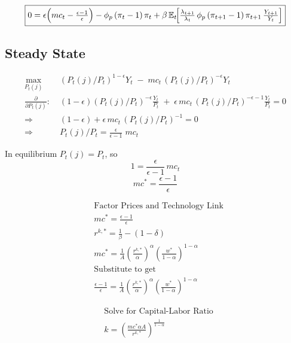 \documentclass[11pt,preprint]{elsarticle}
\numberwithin{equation}{section}
\numberwithin{figure}{section}
\numberwithin{table}{section}
\begin{document}
\begin{equation}\label{rotemberg_FOC}
\boxed{
  0 = \epsilon\Bigl(mc_t - \tfrac{\epsilon-1}{\epsilon}\Bigr)
      - \phi_p\,(\pi_t - 1)\,\pi_t
      + \beta\,\mathbb{E}_t\!
        \Bigl[
          \tfrac{\lambda_{t+1}}{\lambda_t}\,
          \phi_p\,(\pi_{t+1}-1)\,\pi_{t+1}\,
          \tfrac{Y_{t+1}}{Y_t}
        \Bigr]
}
\end{equation}

\newpage

\subsection{\texorpdfstring{Steady State
\label{steady_state_app}}{Steady State }}\label{steady-state-1}

\begin{align*}
\max_{P_t(j)}\;&(P_t(j)/P_t)^{1-\epsilon}Y_t \;-\; mc_t\,(P_t(j)/P_t)^{-\epsilon}Y_t \\[6pt]
\frac{\partial}{\partial P_t(j)}:\;&(1-\epsilon)(P_t(j)/P_t)^{-\epsilon}\frac{Y_t}{P_t}
\;+\;\epsilon\,mc_t\,(P_t(j)/P_t)^{-\epsilon-1}\frac{Y_t}{P_t}=0 \\[6pt]
\Rightarrow\;&(1-\epsilon)+\epsilon\,mc_t\,(P_t(j)/P_t)^{-1}=0 \\[4pt]
\Rightarrow\;&P_t(j)/P_t=\frac{\epsilon}{\epsilon-1}\;mc_t
\end{align*}

In equilibrium \(P_t(j)=P_t\), so \[
1=\frac{\epsilon}{\epsilon-1}\,mc_t
\] \begin{equation}\label{eq:mc}
mc^*=\frac{\epsilon-1}{\epsilon}
\end{equation}

\begin{align*}
& \text{Factor Prices and Technology Link} \\
& mc^* = \frac{\epsilon - 1}{\epsilon} \\
& r^{k,*} = \frac{1}{\beta} - (1 - \delta) \\
& mc^* = \frac{1}{A} \left( \frac{r^{k,*}}{\alpha} \right)^{\alpha}
            \left( \frac{w^*}{1-\alpha} \right)^{1-\alpha} \\
& \text{Substitute to get} \\
& \frac{\epsilon - 1}{\epsilon}
  = \frac{1}{A} \left( \frac{r^{k,*}}{\alpha} \right)^{\alpha}
    \left( \frac{w^*}{1-\alpha} \right)^{1-\alpha}
\end{align*}

\begin{align*}
& \text{Solve for Capital-Labor Ratio} \\
& k = \left(\frac{mc^*\alpha A}{r^{k,*}}\right)^{\!\frac{1}{1-\alpha}}
\end{align*}
\end{document}
